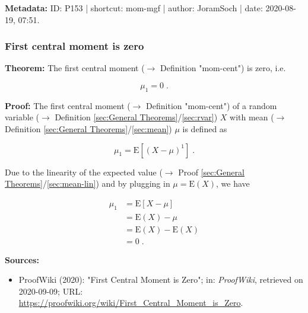 \documentclass[a4paper,12pt,twoside]{book}
\begin{document}
\vspace{1em}
\textbf{Metadata:} ID: P153 | shortcut: mom-mgf | author: JoramSoch | date: 2020-08-19, 07:51.
\vspace{1em}



\subsubsection[\textbf{First central moment is zero}]{First central moment is zero} \label{sec:momcent-1st}
\setcounter{equation}{0}

\textbf{Theorem:} The first central moment ($\rightarrow$ Definition "mom-cent") is zero, i.e.

\begin{equation} \label{eq:momcent-1st-momcent-1st}
\mu_1 = 0 \; .
\end{equation}


\vspace{1em}
\textbf{Proof:} The first central moment ($\rightarrow$ Definition "mom-cent") of a random variable ($\rightarrow$ Definition \ref{sec:General Theorems}/\ref{sec:rvar}) $X$ with mean ($\rightarrow$ Definition \ref{sec:General Theorems}/\ref{sec:mean}) $\mu$ is defined as

\begin{equation} \label{eq:momcent-1st-momcent-1st-def}
\mu_1 = \mathrm{E}\left[ (X-\mu)^1 \right] \; .
\end{equation}

Due to the linearity of the expected value ($\rightarrow$ Proof \ref{sec:General Theorems}/\ref{sec:mean-lin}) and by plugging in $\mu = \mathrm{E}(X)$, we have

\begin{equation} \label{eq:momcent-1st-momcent-1st-qed}
\begin{split}
\mu_1 &= \mathrm{E}\left[ X-\mu \right] \\
&= \mathrm{E}(X) - \mu \\
&= \mathrm{E}(X) - \mathrm{E}(X) \\
&= 0 \; .
\end{split}
\end{equation}


\vspace{1em}
\textbf{Sources:}
\begin{itemize}
\item ProofWiki (2020): "First Central Moment is Zero"; in: \textit{ProofWiki}, retrieved on 2020-09-09; URL: \url{https://proofwiki.org/wiki/First_Central_Moment_is_Zero}.
\end{itemize}
\end{document}
